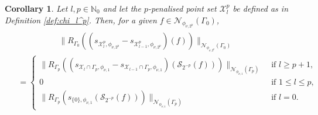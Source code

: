 \documentclass[pdflatex,sn-mathphys-num]{sn-jnl}%
\theoremstyle{thmstyleone}%
\newtheorem{corollary}{Corollary}
\theoremstyle{thmstyletwo}%
\theoremstyle{thmstylethree}%
\begin{document}
\begin{corollary}\label{corr: rkhs norm differences}
    Let \(l,p\in\mathbb{N}_0\) and let the \(p\)-penalised point set \(\mathcal{X}_l^p\) be defined as in Definition \ref{def:chi_l^p}. Then, for a given \(f\in\mathcal{N}_{\phi_{\nu,2^p}}(\Gamma_0)\),
    \begin{align}
    \begin{split}
        &\quad\qquad\qquad\|R_{\Gamma_0}((s_{\mathcal{X}^{p}_{l},\phi_{\nu,2^{p}}}-s_{\mathcal{X}^{p}_{l-1},\phi_{\nu,2^{p}}})(f))\|_{\mathcal{N}_{\phi_{\nu,2^p}}(\Gamma_0)} \\
        &=\begin{cases}
            \|R_{\Gamma_p}((s_{\mathcal{X}_{l}\cap\Gamma_p,\phi_{\nu,1}}-s_{\mathcal{X}_{l-1}\cap\Gamma_p,\phi_{\nu,1}})(\mathcal{S}_{2^{-p}}(f)))\|_{\mathcal{N}_{\phi_{\nu,1}}(\Gamma_p)} & \textrm{ if }l\geq p+1,\\
            0 & \textrm{ if }1\leq l \leq p,\\
            \|R_{\Gamma_p}(s_{\{0\},\phi_{\nu,1}}(\mathcal{S}_{2^{-p}}(f)))\|_{\mathcal{N}_{\phi_{\nu,1}}(\Gamma_p)} & \textrm{ if } l=0.
        \end{cases} 
    \end{split}\nonumber
    \end{align}
\end{corollary}
\end{document}
